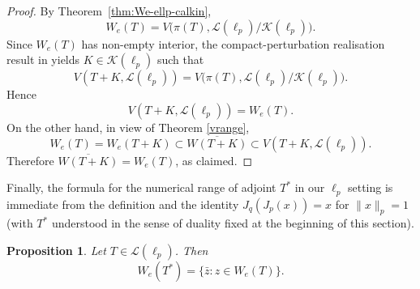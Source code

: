 \documentclass[11pt]{amsart}
\numberwithin{equation}{section}
\newtheorem{proposition}[theorem]{Proposition}
\theoremstyle{definition}
\theoremstyle{remark}
\newcommand{\We}{W_e}
\begin{document}
\begin{proof}
By Theorem~\ref{thm:We-ellp-calkin},
\[
        \We(T)
        =
        V\bigl(\pi(T),\mathcal L(\ell_p)/\mathcal K(\ell_p)\bigr).
\]
Since \(\We(T)\) has non-empty interior, the compact-perturbation
realisation result in \cite[Theorem~3.1, Remark~2]{ChSSW}
yields \(K\in\mathcal K(\ell_p)\) such that
\[
        V(T+K,\mathcal L(\ell_p))
        =
        V\bigl(\pi(T),\mathcal L(\ell_p)/\mathcal K(\ell_p)\bigr).
\]
Hence
\[
        V(T+K,\mathcal L(\ell_p))=\We(T).
\]
On the other hand, in view of Theorem \ref{vrange},
\[
        \We(T)=\We(T+K)\subset \overline{W(T+K)}
        \subset V(T+K,\mathcal L(\ell_p)).
\]
Therefore \(\overline{W(T+K)}=\We(T)\), as claimed.
\end{proof}

Finally, the formula for the numerical range of adjoint $T^*$ in our $\ell_p$ setting is immediate from the definition and the identity $J_q(J_p(x))=x$ for $\|x\|_p=1$ (with $T^*$ understood in the sense of duality fixed at the beginning of this section).
\begin{proposition}\label{prop:We-adjoint-ellp}
Let $T\in \mathcal L(\ell_p)$. Then
\[
\We(T^*)=\{\bar z: z\in \We(T)\}.
\]
\end{proposition}
\end{document}
